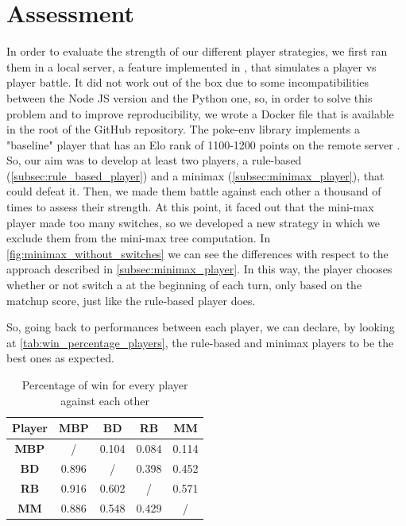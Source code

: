 \section{Assessment}\label{sec:assessment}
In order to evaluate the strength of our different player strategies, we first ran them in a local server, a feature implemented in \cite{poke_env}, that simulates a player vs player battle. It did not work out of the box due to some incompatibilities between the Node JS version and the Python one, so, in order to solve this problem and to improve reproducibility, we wrote a Docker \cite{merkel2014docker} file that is available in the root of the GitHub repository. The poke-env library \cite{poke_env} implements a "baseline" player that has an Elo rank of 1100-1200 points on the remote server \cite{showdown_competition}. So, our aim was to develop at least two players, a rule-based (\autoref{subsec:rule_based_player}) and a minimax (\autoref{subsec:minimax_player}), that could defeat it. Then, we made them battle against each other a thousand of times to assess their strength. At this point, it faced out that the mini-max player made too many \poke switches, so we developed a new strategy in which we exclude them from the mini-max tree computation. In \autoref{fig:minimax_without_switches} we can see the differences with respect to the approach described in \autoref{subsec:minimax_player}. In this way, the player chooses whether or not switch a \poke at the beginning of each turn, only based on the matchup score, just like the rule-based player does.

So, going back to performances between each player, we can declare, by looking at \autoref{tab:win_percentage_players}, the rule-based and minimax players to be the best ones as expected.
\begin{table}[!htbp]
    \footnotesize
    \centering
    \begin{tabular}{c|c|c|c|c}
        \hline \hline
         \textbf{Player} & \textbf{MBP} & \textbf{BD} & \textbf{RB} & \textbf{MM} \\ \hline \hline
         \textbf{MBP} & / & 0.104 & 0.084 & 0.114 \\ \hline
         \textbf{BD} & 0.896 & / & 0.398 & 0.452 \\ \hline
         \textbf{RB} & 0.916 & 0.602 & / & 0.571 \\ \hline
         \textbf{MM} & 0.886 & 0.548 & 0.429 & / \\ \hline \hline
    \end{tabular}
    \caption{Percentage of win for every player against each other}
    \label{tab:win_percentage_players}
\end{table}

